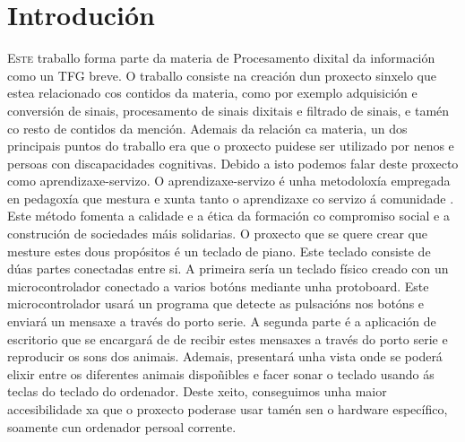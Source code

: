 \chapter{Introdución}
\label{chap:introducion}

\lettrine{E}{ste} traballo forma parte da materia de Procesamento dixital da información como un TFG breve. O traballo consiste na creación dun proxecto sinxelo que estea relacionado cos contidos da materia, como por exemplo adquisición e conversión de sinais, procesamento de sinais dixitais e filtrado de sinais, e tamén co resto de contidos da mención. Ademais da relación ca materia, un dos principais puntos do traballo era que o proxecto puidese ser utilizado por nenos e persoas con discapacidades cognitivas. Debido a isto podemos falar deste proxecto como aprendizaxe-servizo.
\newline\newline
O aprendizaxe-servizo é unha metodoloxía empregada en pedagoxía que mestura e xunta tanto o aprendizaxe co servizo á comunidade \cite{AprendizaxeServizo}. Este método fomenta a calidade e a ética da formación co compromiso social e a construción de sociedades máis solidarias.
\newline\newline
O proxecto que se quere crear que mesture estes dous propósitos é un teclado de piano. Este teclado consiste de dúas partes conectadas entre si. A primeira sería un teclado físico creado con un microcontrolador conectado a varios botóns mediante unha protoboard. Este microcontrolador usará un programa que detecte as pulsacións nos botóns e enviará un mensaxe a través do porto serie. A segunda parte é a aplicación de escritorio que se encargará de de recibir estes mensaxes a través do porto serie e reproducir os sons dos animais. Ademais, presentará unha vista onde se poderá elixir entre os diferentes animais dispoñibles e facer sonar o teclado usando ás teclas do teclado do ordenador. Deste xeito, conseguimos unha maior accesibilidade xa que o proxecto poderase usar tamén sen o hardware específico, soamente cun ordenador persoal corrente.
\newline\newline

%


